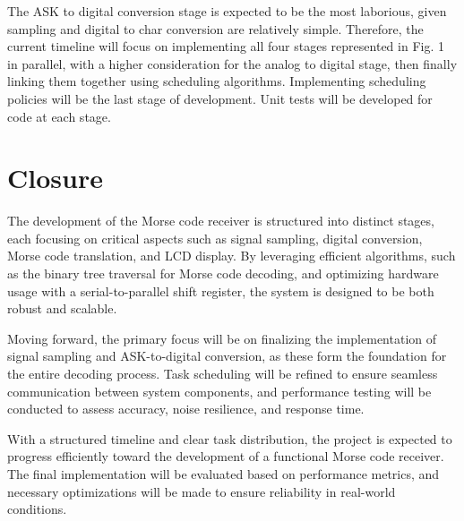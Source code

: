\documentclass{cce2014-design}
\begin{document}
The ASK to digital conversion stage is expected to be the most laborious, given sampling and digital to char conversion are relatively simple. Therefore, the current timeline will focus on implementing all four stages represented in Fig. 1 in parallel, with a higher consideration for the analog to digital stage, then finally linking them together using scheduling algorithms. Implementing scheduling policies will be the last stage of development. Unit tests will be developed for code at each stage.


\section{Closure}
The development of the Morse code receiver is structured into distinct stages, each focusing on critical aspects such as signal sampling, digital conversion, Morse code translation, and LCD display. By leveraging efficient algorithms, such as the binary tree traversal for Morse code decoding, and optimizing hardware usage with a serial-to-parallel shift register, the system is designed to be both robust and scalable.

Moving forward, the primary focus will be on finalizing the implementation of signal sampling and ASK-to-digital conversion, as these form the foundation for the entire decoding process. Task scheduling will be refined to ensure seamless communication between system components, and performance testing will be conducted to assess accuracy, noise resilience, and response time.

With a structured timeline and clear task distribution, the project is expected to progress efficiently toward the development of a functional Morse code receiver. The final implementation will be evaluated based on performance metrics, and necessary optimizations will be made to ensure reliability in real-world conditions.






\begin{bibliography}

\end{bibliography}
\end{document}
